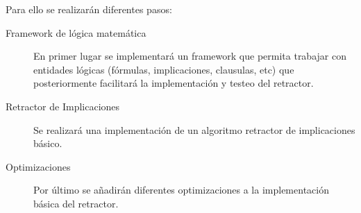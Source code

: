 	Para ello se realizarán diferentes pasos:

	\begin{description}
	
		\item[Framework de lógica matemática]
		En primer lugar se implementará un framework que permita trabajar con entidades lógicas (fórmulas, implicaciones, clausulas, etc)
		que posteriormente facilitará la implementación y testeo del retractor.
		
		\item[Retractor de Implicaciones]
		Se realizará una implementación de un algoritmo retractor de implicaciones básico.
		
		\item[Optimizaciones]
		Por último se añadirán diferentes optimizaciones a la implementación básica del retractor.
	
	\end{description}

 